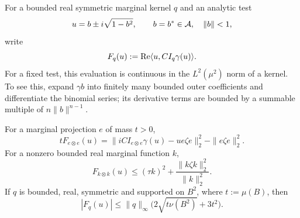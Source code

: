 For a bounded real symmetric marginal kernel $q$ and an analytic test
\[
 u=b\pm i\sqrt{1-b^2},\qquad b=b^*\in\mathcal A,\quad\|b\|<1,
\]
write
\[
 F_q(u):=\operatorname{Re}\langle u,CI_q\gamma(u)\rangle.
\]
For a fixed test, this evaluation is continuous in the $L^2(\mu^2)$ norm of a kernel.
To see this, expand $\gamma b$ into finitely many bounded outer coefficients and differentiate the binomial series; its derivative terms are bounded by a summable multiple of $n\|b\|^{n-1}$.

\begin{lemma}\label{lem:kernel-energy}
For a marginal projection $e$ of mass $t>0$,
\begin{equation}\label{eq:projection-square}
 tF_{e\otimes e}(u)=\|iCI_{e\otimes e}\gamma(u)-ue\zeta e\|_2^2-\|e\zeta e\|_2^2.
\end{equation}
For a nonzero bounded real marginal function $k$,
\begin{equation}\label{eq:uncentered}
 F_{k\otimes k}(u)\le(\tau k)^2+\frac{\|k\zeta k\|_2^2}{\|k\|_2^2}.
\end{equation}
If $q$ is bounded, real, symmetric and supported on $B^2$, where $t:=\mu(B)$, then
\begin{equation}\label{eq:localized}
 |F_q(u)|\le\|q\|_\infty\bigl(2\sqrt{t\nu(B^2)}+3t^2\bigr).
\end{equation}
\end{lemma}
